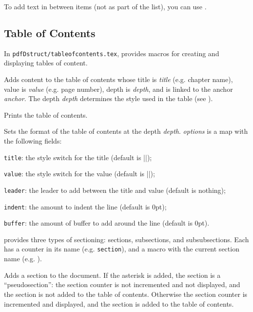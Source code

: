 To add text in between items (not as part of the list), you can use \macro\mtext\anchormacro\mtext.

\subsection{Table of Contents}

In {\tt pdfDstruct/tableofcontents.tex}, \pdftoolbox{} provides macros for creating and displaying tables of content.

Adds content to the table of contents whose title is {\it title} (e.g. chapter name), value is {\it value} (e.g. page number), depth is {\it depth}, and is linked to the anchor {\it anchor}.
The depth {\it depth} determines the style used in the table (see \gotomacro\settocdepthformat).
\emacroexp

\macroexp{\tableofcontents}
Prints the table of contents.
\emacroexp

Sets the format of the table of contents at the depth {\it depth}.
{\it options} is a map with the following fields:
\blist
    \item {\tt title}: the style switch for the title (default is \inlinecode||);
    \item {\tt value}: the style switch for the value (default is \inlinecode||);
    \item {\tt leader}: the leader to add between the title and value (default is nothing);
    \item {\tt indent}: the amount to indent the line (default is 0pt);
    \item {\tt buffer}: the amount of buffer to add around the line (default is 0pt).
\elist
\emacroexp

\pdftoolbox{} provides three types of sectioning: sections, subsections, and subsubsections.
Each has a counter in its name (e.g. {\tt section}), and a macro with the current section name (e.g. \macro\currsection).

Adds a section to the document.
If the asterisk is added, the section is a ``pseudosection'': the section counter is not incremented and not displayed, and the section is not added to the table of contents.
Otherwise the section counter is incremented and displayed, and the section is added to the table of contents.
\emacroexp

